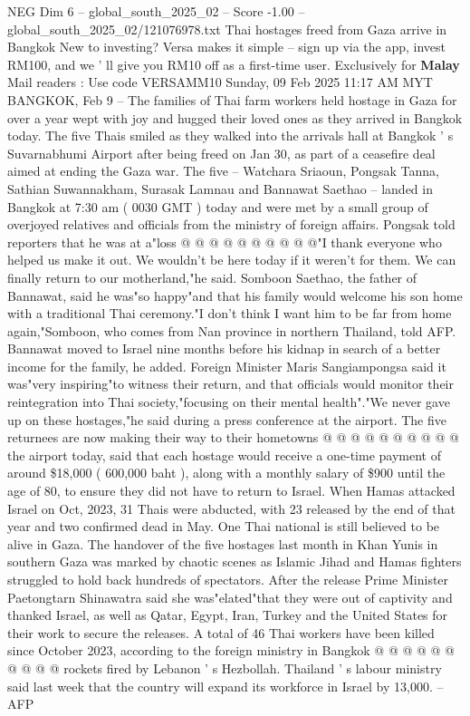 \begin{textsample}{NEG Dim 6 – global\_south\_2025\_02 – Score -1.00 – global\_south\_2025\_02/121076978.txt}  \label{ex:f6_neg_050}
Thai hostages freed from Gaza arrive in Bangkok New to investing?
Versa makes it simple -- sign up via the app, invest RM100, and we ' ll give you RM10 off as a first-time user.
Exclusively for \textbf{Malay} Mail readers : Use code VERSAMM10 Sunday, 09 Feb 2025 11:17 AM MYT BANGKOK, Feb 9 -- The families of Thai farm workers held hostage in Gaza for over a year wept with joy and hugged their loved ones as they arrived in Bangkok today.
The five Thais smiled as they walked into the arrivals hall at Bangkok ' s Suvarnabhumi Airport after being freed on Jan 30, as part of a ceasefire deal aimed at ending the Gaza war.
The five -- Watchara Sriaoun, Pongsak Tanna, Sathian Suwannakham, Surasak Lamnau and Bannawat Saethao -- landed in Bangkok at 7:30 am ( 0030 GMT ) today and were met by a small group of overjoyed relatives and officials from the ministry of foreign affairs.
Pongsak told reporters that he was at a"loss @ @ @ @ @ @ @ @ @ @"I thank everyone who helped us make it out.
We wouldn't be here today if it weren't for them.
We can finally return to our motherland,"he said.
Somboon Saethao, the father of Bannawat, said he was"so happy"and that his family would welcome his son home with a traditional Thai ceremony."I don't think I want him to be far from home again,"Somboon, who comes from Nan province in northern Thailand, told AFP.
Bannawat moved to Israel nine months before his kidnap in search of a better income for the family, he added.
Foreign Minister Maris Sangiampongsa said it was"very inspiring"to witness their return, and that officials would monitor their reintegration into Thai society,"focusing on their mental health"."We never gave up on these hostages,"he said during a press conference at the airport.
The five returnees are now making their way to their hometowns @ @ @ @ @ @ @ @ @ @ the airport today, said that each hostage would receive a one-time payment of around \$18,000 ( 600,000 baht ), along with a monthly salary of \$900 until the age of 80, to ensure they did not have to return to Israel.
When Hamas attacked Israel on Oct, 2023, 31 Thais were abducted, with 23 released by the end of that year and two confirmed dead in May.
One Thai national is still believed to be alive in Gaza.
The handover of the five hostages last month in Khan Yunis in southern Gaza was marked by chaotic scenes as Islamic Jihad and Hamas fighters struggled to hold back hundreds of spectators.
After the release Prime Minister Paetongtarn Shinawatra said she was"elated"that they were out of captivity and thanked Israel, as well as Qatar, Egypt, Iran, Turkey and the United States for their work to secure the releases.
A total of 46 Thai workers have been killed since October 2023, according to the foreign ministry in Bangkok @ @ @ @ @ @ @ @ @ @ rockets fired by Lebanon ' s Hezbollah.
Thailand ' s labour ministry said last week that the country will expand its workforce in Israel by 13,000. -- AFP

\end{textsample}
